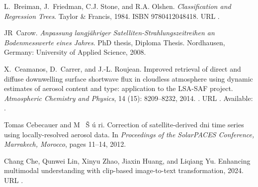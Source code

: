 \documentclass[letterpaper,12pt, twoside]{report}
\providecommand{\DIFdeltex}[1]{{\protect\color{red} \scriptsize #1}} %
\providecommand{\DIFdel}[1]{\texorpdfstring{\DIFdeltex{#1}}{}} %
\begin{document}
\DIFdel{L.~Breiman, J.~Friedman, C.J. Stone, and R.A. Olshen.
}%
\DIFdel{\emph{Classification and Regression Trees}.
}%
\DIFdel{Taylor \& Francis, 1984.
}%
\DIFdel{ISBN 9780412048418.
}%
\DIFdel{URL }%
\DIFdel{.
}%

\DIFdel{JR~Carow.
}%
\DIFdel{\emph{Anpassung langj{\"a}hriger Satelliten-Strahlungszeitreihen an
  Bodenmesswerte eines Jahres}.
}%
\DIFdel{PhD thesis, Diploma Thesis. Nordhausen, Germany: University of
  Applied Science, 2008.
}%

\DIFdel{X.~Ceamanos, D.~Carrer, and J.-L. Roujean.
}%
\DIFdel{Improved retrieval of direct and diffuse downwelling surface
  shortwave flux in cloudless atmosphere using dynamic estimates of aerosol
  content and type: application to the }%
\DIFdel{LSA-SAF}%
\DIFdel{project.
}%
\DIFdel{\emph{Atmospheric Chemistry and Physics}, 14}%
\DIFdel{(15):}%
\DIFdel{8209--8232, 2014.
}%
\DIFdel{.
}%
\DIFdel{URL }%
\DIFdel{.
}%
\DIFdel{Available: }%
\DIFdel{.
}%

\DIFdel{Tomas Cebecauer and M~}%
\DIFdel{\v{S}}%
\DIFdel{\'u}%
\DIFdel{ri.
}%
\DIFdel{Correction of satellite-derived dni time series using
  locally-resolved aerosol data.
}%
\DIFdel{In \emph{Proceedings of the SolarPACES Conference, Marrakech,
  Morocco}, pages 11--14, 2012.
}%

\DIFdel{Chang Che, Qunwei Lin, Xinyu Zhao, Jiaxin Huang, and Liqiang Yu.
}%
\DIFdel{Enhancing multimodal understanding with clip-based image-to-text
  transformation, 2024.
}%
\DIFdel{URL }%
\DIFdel{.
}%
\end{document}
